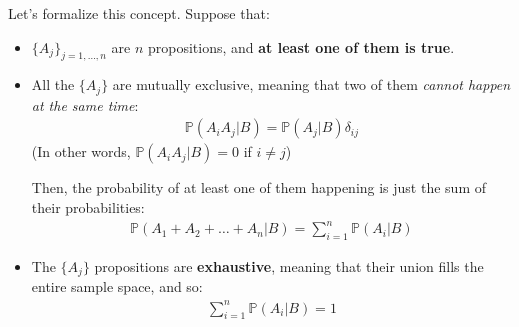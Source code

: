 \documentclass[../template.tex]{subfiles}
\begin{document}
Let's formalize this concept. Suppose that:
\begin{itemize}
    \item $\{A_j\}_{j=1,\dots,n}$ are $n$ propositions, and \textbf{at least one of them is true}.
    \item All the $\{A_j\}$ are mutually exclusive, meaning that two of them \textit{cannot happen at the same time}: 
    \begin{align*}
        \mathbb{P}(A_iA_j|B) = \mathbb{P}(A_j|B) \delta_{ij}
    \end{align*}
    (In other words, $\mathbb{P}(A_i A_j|B) = 0$ if $i\neq j$)
    \medskip

    Then, the probability of at least one of them happening is just the sum of their probabilities:
    \begin{align*}
        \mathbb{P}(A_1 + A_2 + \dots + A_n|B) = \sum_{i=1}^n \mathbb{P}(A_i|B) 
    \end{align*}
    \item The $\{A_j\}$ propositions are \textbf{exhaustive}, meaning that their union fills the entire sample space, and so:
    \begin{align*}
        \sum_{i=1}^n \mathbb{P}(A_i|B) = 1
    \end{align*} 
\end{itemize}
\end{document}

